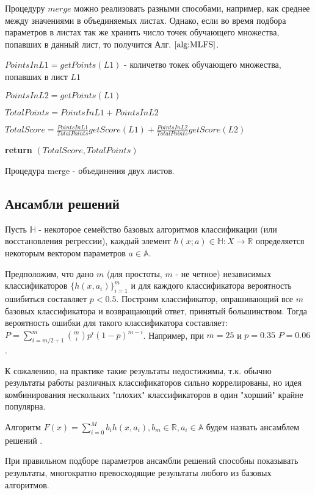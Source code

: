 \documentclass[12pt,a4paper]{report}
\begin{document}
Процедуру $merge$ можно реализовать разными способами, например, как среднее между значениями в объединяемых листах. Однако, если во время подбора параметров в листах так же хранить число точек обучающего множества, попавших в данный лист, то получится Алг. $\ref{alg:MLFS}$.

\begin{algorithm}[H]
\SetAlgoLined
{}
$PointsInL1 = getPoints(L1)$ - количетво токек обучающего множества, попавших в лист $L1$

$PointsInL2 = getPoints(L1)$

$TotalPoints = PointsInL1 + PointsInL2$

$TotalScore = \frac{PointsInL1}{TotalPoints}getScore(L1) + \frac{PointsInL2}{TotalPoints}getScore(L2)$

\textbf{return} $(TotalScore, TotalPoints)$
\caption{Процедура merge - объединения двух листов.}
\label{alg:MLFS}
\end{algorithm}

\subsection{Ансамбли решений}
Пусть $\mathbb{H}$ - некоторое семейство базовых алгоритмов классификации (или восстановления регрессии), каждый элемент $h(x; a) \in \mathbb{H} : X \to \mathbb{R}$ определяется некоторым вектором параметров $a \in \mathbb{A}$.

Предположим, что дано $m$ (для простоты, $m$ - не четное) независимых классификаторов $\{h(x, a_i)\}_{i=1}^m$ и для каждого классификатора вероятность ошибиться составляет $p < 0.5$.	Построим классификатор, опрашивающий все $m$ базовых классификатора и возвращающий ответ, принятый большинством. Тогда вероятность ошибки для такого классификатора составляет: $P = \sum_{i = m/2 + 1}^m \binom{m}{i}p^{i}(1-p)^{m-i}$. Например, при $m=25$ и $p=0.35$ $P=0.06$.

К сожалению, на практике такие результаты недостижимы, т.к. обычно результаты работы различных классификаторов сильно коррелированы, но идея комбинирования нескольких "плохих" классификаторов в один "хорший" крайне популярна.

\begin{Def}
Алгоритм $F(x) = \sum_{i=0}^{M}b_ih(x,a_i), b_m \in \mathbb{R}, a_i \in \mathbb{A}$ будем назвать ансамблем решений \cite{En}.
\end{Def}
При правильном подборе параметров ансамбли решений способны показывать результаты, многократно превосходящие результаты любого из базовых алгоритмов.
\end{document}
